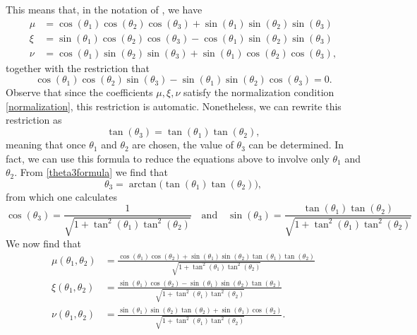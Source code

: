\documentclass[reqno]{amsart}
\numberwithin{lemma}{section}
\numberwithin{proposition}{section}
\begin{document}

This means that, in the notation of \cite{REZAKHANI2005278}, we have
\begin{align*}
	\mu  &= \cos(\theta_{1}) \cos(\theta_{2}) \cos(\theta_{3}) + \sin(\theta_{1}) \sin(\theta_{2}) \sin(\theta_{3})\\
	\xi &= \sin(\theta_{1}) \cos(\theta_{2}) \cos(\theta_{3}) - \cos(\theta_{1}) \sin(\theta_{2}) \sin(\theta_{3})\\
	\nu &= \cos(\theta_{1}) \sin(\theta_{2}) \sin(\theta_{3}) + \sin(\theta_{1}) \cos(\theta_{2}) \cos(\theta_{3}),
\end{align*}
together with the restriction that
\begin{equation*}
	\cos(\theta_{1}) \cos(\theta_{2}) \sin(\theta_{3}) - \sin(\theta_{1}) \sin(\theta_{2}) \cos(\theta_{3}) = 0.
\end{equation*}
Observe that since the coefficients $\mu, \xi, \nu$ satisfy the normalization condition \eqref{normalization}, this restriction is automatic. Nonetheless, we can rewrite this restriction as
\begin{equation}
	\label{theta3formula}
	\tan(\theta_{3}) = \tan(\theta_{1}) \tan(\theta_{2}),
\end{equation}
meaning that once $\theta_{1}$ and $\theta_{2}$ are chosen, the value of $\theta_{3}$ can be determined. In fact, we can use this formula to reduce the equations above to involve only $\theta_{1}$ and $\theta_{2}$. From \eqref{theta3formula} we find that
\begin{equation*}
	\theta_{3} = \arctan \Big ( \tan(\theta_{1}) \tan(\theta_{2}) \Big ),
\end{equation*}
from which one calculates
\begin{equation*}
	\cos(\theta_{3}) = \frac{1}{\sqrt{1 + \tan^{2}(\theta_{1}) \tan^{2}(\theta_{2})}} \quad \text{and} \quad \sin(\theta_{3}) = \frac{\tan(\theta_{1}) \tan(\theta_{2})}{\sqrt{1 + \tan^{2}(\theta_{1}) \tan^{2}(\theta_{2})}}
\end{equation*}
We now find that
\begin{align*}
	\mu(\theta_{1}, \theta_{2}) &= \frac{\cos(\theta_{1}) \cos(\theta_{2}) + \sin(\theta_{1}) \sin(\theta_{2}) \tan(\theta_{1}) \tan(\theta_{2})}{\sqrt{1 + \tan^{2}(\theta_{1}) \tan^{2}(\theta_{2})}}\\
	\xi(\theta_{1}, \theta_{2}) &= \frac{\sin(\theta_{1}) \cos(\theta_{2}) - \sin(\theta_{1}) \sin(\theta_{2}) \tan(\theta_{2})}{\sqrt{1 + \tan^{2}(\theta_{1}) \tan^{2}(\theta_{2})}}\\
	\nu(\theta_{1}, \theta_{2}) &= \frac{\sin(\theta_{1}) \sin(\theta_{2}) \tan(\theta_{2}) + \sin(\theta_{1}) \cos(\theta_{2})}{\sqrt{1 + \tan^{2}(\theta_{1}) \tan^{2}(\theta_{2})}}.
\end{align*}
\end{document}
